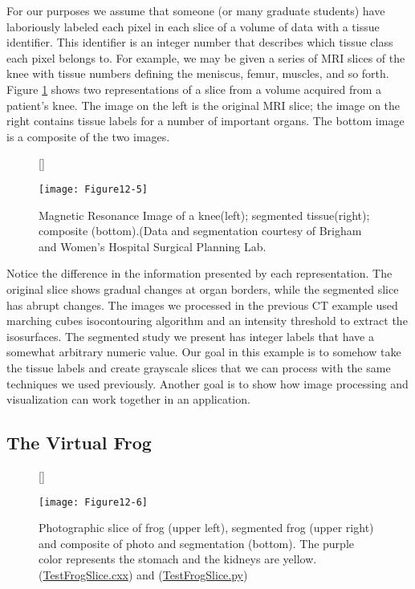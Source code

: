 For our purposes we assume that someone (or many graduate students) have laboriously labeled each pixel in each slice of a volume of data with a tissue identifier. This identifier is an integer number that describes which tissue class each pixel belongs to. For example, we may be given a series of MRI slices of the knee with tissue numbers defining the meniscus, femur, muscles, and so forth. Figure \ref{fig:Figure12-5} shows two representations of a slice from a volume acquired from a patient's knee. The image on the left is the original MRI slice; the image on the right contains tissue labels for a number of important organs. The bottom image is a composite of the two images.

\begin{figure}[!htb]
	[\FBwidth]
	{\caption{Magnetic Resonance Image of a knee(left); segmented tissue(right); composite (bottom).(Data and segmentation courtesy of Brigham and Women's Hospital Surgical Planning Lab.}\label{fig:Figure12-5}}
	{\texttt{[image: Figure12-5]}}
\end{figure}

Notice the difference in the information presented by each representation. The original slice shows gradual changes at organ borders, while the segmented slice has abrupt changes. The images we processed in the previous CT example used marching cubes isocontouring algorithm and an intensity threshold to extract the isosurfaces. The segmented study we present has integer labels that have a somewhat arbitrary numeric value. Our goal in this example is to somehow take the tissue labels and create grayscale slices that we can process with the same techniques we used previously. Another goal is to show how image processing and visualization can work together in an application.

\subsection{The Virtual Frog}

\begin{figure}[!htb]
	[\FBwidth]
	{\caption{Photographic slice of frog (upper left), segmented frog (upper right) and composite of photo and segmentation (bottom). The purple color represents the stomach and the kidneys are yellow.(\href{https://lorensen.github.io/VTKExamples/site/Cxx/Visualization/TestFrogSlice/}{TestFrogSlice.cxx}) and (\href{https://lorensen.github.io/VTKExamples/site/Python/Visualization/TestFrogSlice/}{TestFrogSlice.py})}\label{fig:Figure12-6}}
	{\texttt{[image: Figure12-6]}}
\end{figure}

